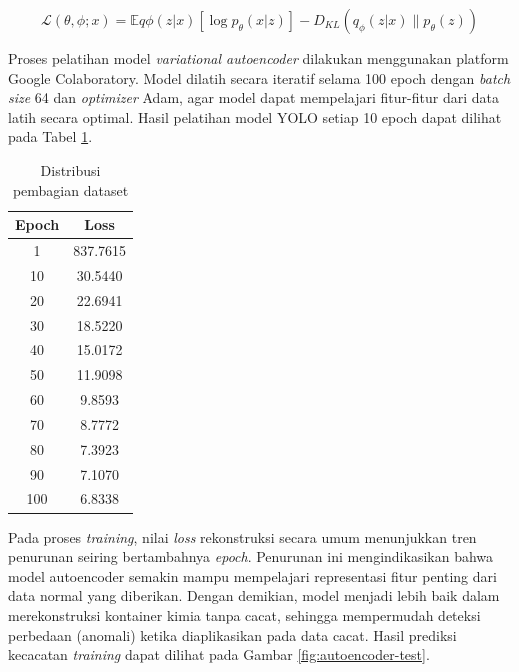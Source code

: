 \begin{equation}
  \mathcal{L}(\theta, \phi; x) = \mathbb{E}{q\phi(z|x)}[\log
  p_\theta(x|z)] - D_{KL}(q_\phi(z|x) \parallel p_\theta(z))
\end{equation}

Proses pelatihan model \textit{variational autoencoder} dilakukan
menggunakan platform Google
Colaboratory. Model dilatih secara iteratif selama 100 epoch dengan
\textit{batch size} 64
dan \textit{optimizer} Adam, agar model dapat mempelajari fitur-fitur dari
data latih secara
optimal. Hasil pelatihan model YOLO setiap 10 epoch dapat dilihat
pada Tabel \ref{tab:training-autoencoder}.

\begin{table}[H]
  \caption{Distribusi pembagian dataset}
  \label{tab:training-autoencoder}
  \vspace{-1em}
  \centering
  \begin{tabular}{cc}
    \toprule
    \textbf{Epoch} & \textbf{Loss} \\
    \midrule
    1 & 837.7615 \\
    10 & 30.5440 \\
    20 & 22.6941 \\
    30 & 18.5220 \\
    40 & 15.0172 \\
    50 & 11.9098 \\
    60 & 9.8593 \\
    70 & 8.7772 \\
    80 & 7.3923 \\
    90 & 7.1070 \\
    100 & 6.8338 \\
    \bottomrule
  \end{tabular}
\end{table}

Pada proses \textit{training}, nilai \textit{loss} rekonstruksi
secara umum menunjukkan tren penurunan seiring bertambahnya
\textit{epoch}. Penurunan ini mengindikasikan bahwa model autoencoder
semakin mampu mempelajari representasi fitur penting dari data normal
yang diberikan. Dengan demikian, model menjadi lebih baik dalam
merekonstruksi kontainer kimia tanpa cacat, sehingga mempermudah
deteksi perbedaan (anomali) ketika diaplikasikan pada data cacat.
Hasil prediksi kecacatan \textit{training} dapat dilihat
pada Gambar \ref{fig:autoencoder-test}.

